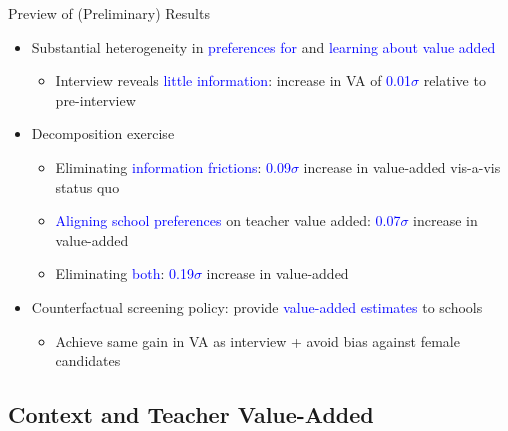 \documentclass[compress,10pt,aspectratio=169]{beamer}
\newcommand\emphblue[1]{\textcolor{blue}{#1}}
\begin{document}
\begin{frame}{Preview of (Preliminary) Results}

    \begin{itemize}
    \item Substantial heterogeneity in \emphblue{preferences for} and \emphblue{learning about value added}
    \begin{itemize}
    \smallskip
        \item[$\Rightarrow$] Interview reveals \emphblue{little information}: increase in VA of \emphblue{0.01$\sigma$} relative to pre-interview
    \end{itemize}
    \bigskip
        \item Decomposition exercise
       \begin{itemize}
       \smallskip
    \item[$\Rightarrow$] Eliminating \emphblue{information frictions}: \emphblue{0.09$\sigma$} increase in value-added vis-a-vis status quo
    \medskip
    \item[$\Rightarrow$] \emphblue{Aligning school preferences} on teacher value added: \emphblue{0.07$\sigma$} increase in value-added
    \medskip
    \item[$\Rightarrow$] Eliminating \emphblue{both}: \emphblue{0.19$\sigma$} increase in value-added
\end{itemize}
        \bigskip
        \item Counterfactual screening policy: provide \emphblue{value-added estimates} to schools
        \begin{itemize}
            \smallskip
            \item[$\Rightarrow$] Achieve same gain in VA as interview + avoid bias against female candidates
        \end{itemize}
    \end{itemize}
\end{frame}

\subsection{Context and Teacher Value-Added}
\end{document}
